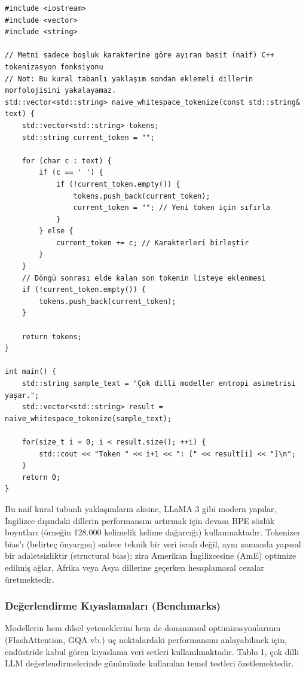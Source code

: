 \documentclass[11pt,a4paper]{article}
\begin{document}
\begin{Verbatim}[breaklines=true,breakanywhere=true,fontsize=\small]
#include <iostream>
#include <vector>
#include <string>

// Metni sadece boşluk karakterine göre ayıran basit (naif) C++ tokenizasyon fonksiyonu
// Not: Bu kural tabanlı yaklaşım sondan eklemeli dillerin morfolojisini yakalayamaz.
std::vector<std::string> naive_whitespace_tokenize(const std::string& text) {
    std::vector<std::string> tokens;
    std::string current_token = "";
    
    for (char c : text) {
        if (c == ' ') {
            if (!current_token.empty()) {
                tokens.push_back(current_token);
                current_token = ""; // Yeni token için sıfırla
            }
        } else {
            current_token += c; // Karakterleri birleştir
        }
    }
    // Döngü sonrası elde kalan son tokenin listeye eklenmesi
    if (!current_token.empty()) {
        tokens.push_back(current_token);
    }
    
    return tokens;
}

int main() {
    std::string sample_text = "Çok dilli modeller entropi asimetrisi yaşar.";
    std::vector<std::string> result = naive_whitespace_tokenize(sample_text);
    
    for(size_t i = 0; i < result.size(); ++i) {
        std::cout << "Token " << i+1 << ": [" << result[i] << "]\n";
    }
    return 0;
}
\end{Verbatim}
Bu naif kural tabanlı yaklaşımların aksine, LLaMA 3 gibi modern yapılar, İngilizce dışındaki dillerin performansını artırmak için devasa BPE sözlük boyutları (örneğin 128.000 kelimelik kelime dağarcığı) kullanmaktadır. Tokenizer bias'ı (belirteç önyargısı) sadece teknik bir veri israfı değil, aynı zamanda yapısal bir adaletsizliktir (structural bias); zira Amerikan İngilizcesine (AmE) optimize edilmiş ağlar, Afrika veya Asya dillerine geçerken hesaplamasal cezalar üretmektedir.

\subsubsection{Değerlendirme Kıyaslamaları (Benchmarks)}
Modellerin hem dilsel yeteneklerini hem de donanımsal optimizasyonlarının (FlashAttention, GQA vb.) uç noktalardaki performansını anlayabilmek için, endüstride kabul gören kıyaslama veri setleri kullanılmaktadır. Tablo 1, çok dilli LLM değerlendirmelerinde günümüzde kullanılan temel testleri özetlemektedir.
\end{document}
